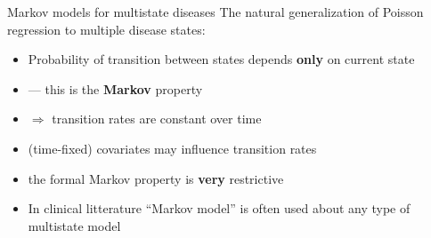 


\begin{frame}{Markov models for multistate diseases}
  The natural generalization of Poisson regression to multiple
    disease states:
  \pause
    \begin{itemize}
    \item Probability of transition between states depends \textbf{only} on current state
    \item --- this is the \textbf{Markov} property
    \item $\Rightarrow$ transition rates are constant over time
    \item (time-fixed) covariates may influence transition rates
    \item the formal Markov property is \textbf{very} restrictive
    \item In clinical litterature ``Markov model'' is often used
      about any type of multistate model
    \end{itemize}
\end{frame}


